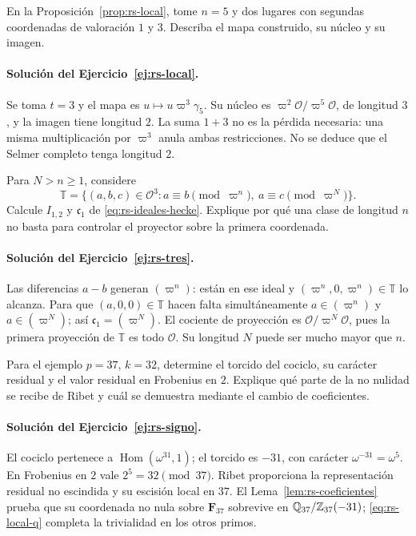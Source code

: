 \begin{ejercicio}\label{ej:rs-local}
En la Proposición~\ref{prop:rs-local}, tome $n=5$ y dos lugares
con segundas coordenadas de valoración $1$ y $3$.
Describa el mapa construido, su núcleo y su imagen.
\end{ejercicio}

\paragraph{Solución del Ejercicio~\ref{ej:rs-local}.}
Se toma $t=3$ y el mapa es $u\mapsto u\varpi^3\gamma_5$.
Su núcleo es $\varpi^2\mathcal O/\varpi^5\mathcal O$, de
longitud $3$, y la imagen tiene longitud $2$.
La suma $1+3$ no es la pérdida necesaria: una misma multiplicación
por $\varpi^3$ anula ambas restricciones. No se deduce que el
Selmer completo tenga longitud $2$.

\begin{ejercicio}\label{ej:rs-tres}
Para $N>n\ge1$, considere
\[
 \mathbb T=\{(a,b,c)\in\mathcal O^3:
               a\equiv b\pmod{\varpi^n},\
               a\equiv c\pmod{\varpi^N}\}.
\]
Calcule $I_{1,2}$ y $\mathfrak c_1$ de
\eqref{eq:rs-ideales-hecke}. Explique por qué una clase de
longitud $n$ no basta para controlar el proyector sobre la
primera coordenada.
\end{ejercicio}

\paragraph{Solución del Ejercicio~\ref{ej:rs-tres}.}
Las diferencias $a-b$ generan $(\varpi^n)$: están en ese ideal
y $(\varpi^n,0,\varpi^n)\in\mathbb T$ lo alcanza.
Para que $(a,0,0)\in\mathbb T$ hacen falta simultáneamente
$a\in(\varpi^n)$ y $a\in(\varpi^N)$; así
$\mathfrak c_1=(\varpi^N)$. El cociente de proyección es
$\mathcal O/\varpi^N\mathcal O$, pues la primera proyección de
$\mathbb T$ es todo $\mathcal O$. Su longitud $N$ puede ser
mucho mayor que $n$.

\begin{ejercicio}\label{ej:rs-signo}
Para el ejemplo $p=37$, $k=32$, determine el torcido del cociclo,
su carácter residual y el valor residual en Frobenius en $2$.
Explique qué parte de la no nulidad se recibe de Ribet y cuál
se demuestra mediante el cambio de coeficientes.
\end{ejercicio}

\paragraph{Solución del Ejercicio~\ref{ej:rs-signo}.}
El cociclo pertenece a $\operatorname{Hom}(\omega^{31},1)$;
el torcido es $-31$, con carácter
$\omega^{-31}=\omega^5$. En Frobenius en $2$ vale
$2^5=32\pmod{37}$. Ribet proporciona la representación residual
no escindida y su escisión local en $37$.
El Lema~\ref{lem:rs-coeficientes} prueba que su coordenada no nula
sobre $\mathbf F_{37}$ sobrevive en
$\mathbb{Q}_{37}/\mathbb{Z}_{37}(-31)$; \eqref{eq:rs-local-q} completa la
trivialidad en los otros primos.

